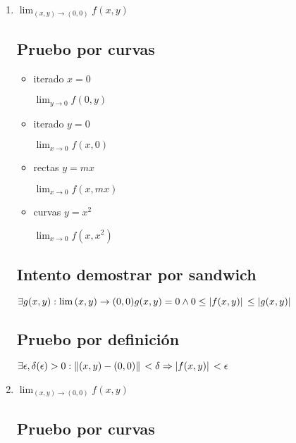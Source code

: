 \documentclass[../parcial.tex]{subfiles}
\begin{document}
    \begin{enumerate}
        \item $ \lim_{(x,y) \to (0,0)} f(x,y) $

        \subsection*{Pruebo por curvas}

        \begin{itemize}
            \item iterado $x = 0$

                $\lim_{y\to0} f(0,y)$

            \item iterado $y = 0$

                $\lim_{x\to0} f(x,0)$

            \item rectas $y = mx$
            
                $\lim_{x\to0} f(x,mx)$

            \item curvas $y = x^2$

                $\lim_{x\to0} f(x,x^2)$

        \end{itemize}

            \subsection*{Intento demostrar por sandwich}
        
            $ \exists g(x,y): \lim{(x,y)\to(0,0)} g(x,y) = 0 \wedge 0 \leq \abs*{f(x,y)} \leq \abs*{g(x,y)} $
        
            \subsection*{Pruebo por definición}

            $ \exists \epsilon,\delta(\epsilon) > 0 : \norm*{(x,y) - (0,0)} < \delta \Rightarrow \abs*{f(x,y)} < \epsilon $


        \item $ \lim_{(x,y) \to (0,0)} f(x,y) $
        
            \subsection*{Pruebo por curvas}


\end{enumerate}
\end{document}
